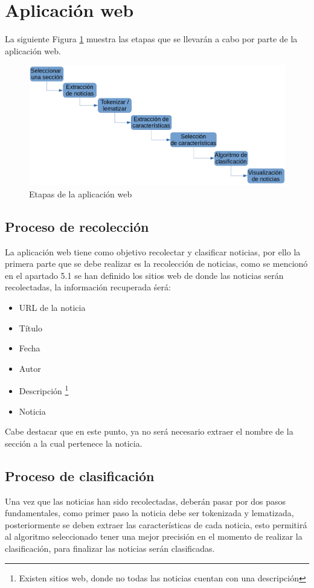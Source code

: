 \section{Aplicación web}

La siguiente Figura \ref{fig:procesoApp} muestra las etapas que se llevarán a cabo por parte de la aplicación web.
\begin{figure}[ht]
\centering
\includegraphics[scale=0.3]{imagenes/Capitulo5/procesoAplicacionWeb.png}
\caption{Etapas de la aplicación web}
\label{fig:procesoApp}
\end{figure}

\subsection{Proceso de recolección}
La aplicación web tiene como objetivo recolectar y clasificar noticias, por ello la primera parte que se debe realizar es la recolección de noticias, como se mencionó en el apartado 5.1 se han definido los sitios web de donde las noticias serán recolectadas, la información recuperada śerá:

\begin{itemize}
	\item URL de la noticia
	\item Título
	\item Fecha
	\item Autor
	\item Descripción \footnote{Existen sitios web, donde no todas las noticias cuentan con una descripción}
	\item Noticia
\end{itemize}

Cabe destacar que en este punto, ya no será necesario extraer el nombre de la sección a la cual pertenece la noticia.
\\
\subsection{Proceso de clasificación}
Una vez que las noticias han sido recolectadas, deberán pasar por dos pasos fundamentales, como primer paso la noticia debe ser tokenizada y lematizada, posteriormente se deben extraer las características de cada noticia, esto permitirá al algoritmo seleccionado tener una mejor precisión en el momento de realizar la clasificación, 
para finalizar las noticias serán clasificadas.

